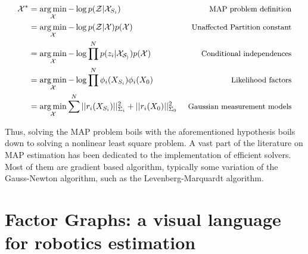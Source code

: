 \begin{align}
    \mathcal{X}^* 
    &= \operatorname*{arg\,min}_{\mathcal{X}} - \log p(\mathcal{Z} | \mathcal{X}_{S_i}) ~&\mbox{\small MAP problem definition}\\
    &= \operatorname*{arg\,min}_{\mathcal{X}} - \log p(\mathcal{Z} | \mathcal{X}) p(\mathcal{X}) ~&\mbox{\small Unaffected Partition constant}\\
    &= \operatorname*{arg\,min}_{\mathcal{X}} - \log \prod^{N} p(z_i | \mathcal{X_{S_i}}) p(\mathcal{X}) ~&\mbox{\small Conditional independences}\\
    &= \operatorname*{arg\,min}_{\mathcal{X}} - \log \prod^{N} \phi_i(X_{S_i}) \phi_i(X_{0}) ~&\mbox{\small Likelihood factors}\\
    &= \operatorname*{arg\,min}_{\mathcal{X}} \sum^{N} ||r_i(X_{S_i})||_{\Sigma_i}^2 + ||r_i(X_{0})||_{\Sigma_0}^2 ~&\mbox{\small Gaussian measurement models}\\
\end{align}

Thus, solving the MAP problem boils with the aforementioned hypothesis boils down to solving a nonlinear least square problem. 
A vast part of the literature on MAP estimation has been dedicated to the implementation of efficient solvers. Most of them are 
gradient based algorithm, typically some variation of the Gauss-Newton algorithm, such as the Levenberg-Marquardt algorithm.


\section{Factor Graphs: a visual language for robotics estimation}










